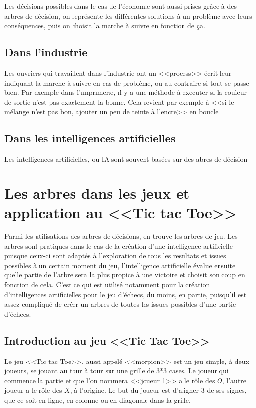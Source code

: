\documentclass{article}
\begin{document}
Les décisions possibles dans le cas de l'économie sont aussi prises grâce à des
arbres de décision,
on représente les différentes solutions à un problème avec leurs conséquences,
puis on choisit 
la marche à suivre en fonction de ça.

\subsection{Dans l'industrie}

Les ouvriers qui travaillent dans l'industrie ont un <<process>> écrit 
leur indiquant la marche à suivre en cas de problème, 
ou au contraire si tout se passe bien. Par exemple dans l'imprimerie, il y a une
méthode à executer si la 
couleur de sortie n'est pas exactement la bonne.
Cela revient par exemple à <<si le mélange n'est pas bon, ajouter un peu de
teinte à l'encre>> en boucle.


\subsection{Dans les intelligences artificielles}

Les intelligences artificielles, ou IA sont souvent basées sur des abres de
décision 

\pagebreak

\section{Les arbres dans les jeux et application au <<Tic tac Toe>>}

Parmi les utilisations des arbres de décisions, on trouve les arbres de jeu.
Les arbres sont pratiques dans le cas de la création d'une intelligence
artificielle puisque 
ceux-ci sont adaptés à l'exploration
de tous les resultats et issues possibles à un certain moment du jeu,
l'intelligence artificielle évalue ensuite quelle partie de l'arbre sera la plus
propice à une victoire et choisit son coup en fonction de cela. C'est ce qui est
utilisé notamment pour la création d'intelligences
artificielles pour le jeu d'échecs, du moins, en partie, puisqu'il est assez compliqué de créer
 un arbres de toutes les issues possibles d'une partie d'échecs.

\subsection{Introduction au jeu <<Tic Tac Toe>>}

Le jeu <<Tic tac Toe>>, aussi appelé <<morpion>> est un jeu simple, à deux joueurs, se jouant au tour à tour sur une grille de 3*3 cases.
Le joueur qui commence la partie et que l'on nommera <<joueur 1>> a le rôle des $O$, l'autre joueur a le rôle des $X$, à l'origine.
Le but du joueur est d'aligner 3 de ses signes, que ce soit en ligne, en colonne ou en diagonale dans la grille.
\end{document}
